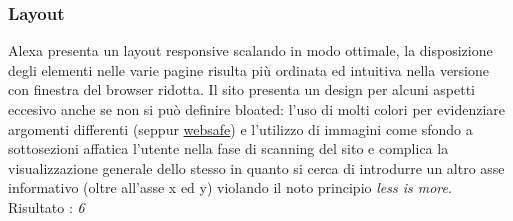 \subsubsection{Layout}
Alexa presenta un layout responsive scalando in modo ottimale, la disposizione degli
elementi nelle varie pagine risulta più ordinata ed intuitiva nella versione
con finestra del browser ridotta.
Il sito presenta un design per alcuni aspetti eccesivo anche se non si può definire bloated: l'uso di molti colori per evidenziare argomenti differenti (seppur \href{http://www.w3schools.com/html/html_colors.asp}{websafe}) e l'utilizzo di immagini come sfondo a sottosezioni affatica l'utente nella 
fase di scanning del sito e complica la visualizzazione generale dello stesso in quanto si cerca di introdurre un altro asse informativo (oltre all'asse x ed y) violando il noto principio \textit{less is more}. \\
Risultato : \textit{6}